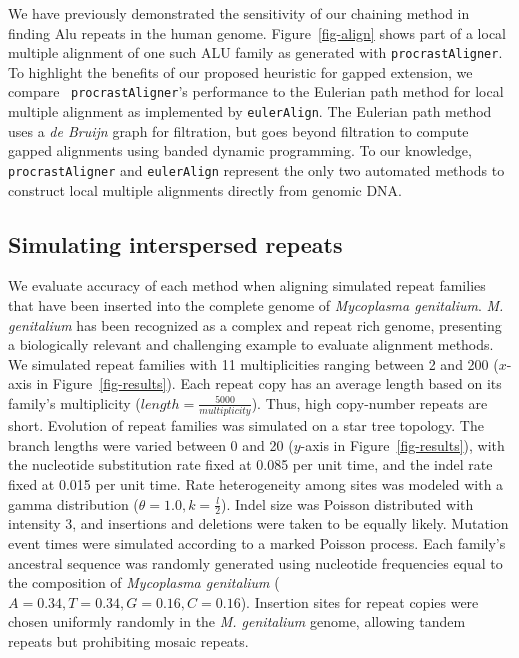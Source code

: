 \documentclass{ws-procs975x65}
\begin{document}
We have previously demonstrated the sensitivity of our chaining method in finding Alu repeats in
the human genome\cite{ref-procrast}. Figure~\ref{fig-align} shows part of a  local multiple alignment of one such ALU family as generated with \texttt{procrastAligner}. To highlight the benefits of our proposed heuristic for gapped extension, we compare ~\texttt{procrastAligner}'s performance to the Eulerian path method for local multiple alignment as implemented by \texttt{eulerAlign}\cite{ref-related1}. The Eulerian path method uses
a \textit{de Bruijn} graph for filtration, but goes beyond filtration to compute gapped alignments using banded dynamic
programming.  To our knowledge, \texttt{procrastAligner} and \texttt{eulerAlign} represent the only two automated methods to construct local multiple alignments directly from genomic DNA.

\subsection{Simulating interspersed repeats}
We evaluate accuracy of each method when aligning simulated repeat families that have been inserted into the complete genome of \emph{Mycoplasma genitalium}. \emph{M. genitalium} has been recognized as a complex and repeat rich genome, presenting a biologically relevant and challenging example to evaluate alignment methods\cite{ref-mycoplasma}. We simulated repeat families with 11 multiplicities ranging between 2 and 200 ($x$-axis in Figure~\ref{fig-results}).  Each repeat copy has an average length based on its family's multiplicity ($length=\frac{5000}{multiplicity}$).  Thus, high copy-number repeats are short.  Evolution of repeat families was simulated on a star tree topology.  The branch lengths were varied between 0 and 20 ($y$-axis in Figure~\ref{fig-results}), with the nucleotide substitution rate fixed at 0.085 per unit time, and the indel rate fixed at 0.015 per unit time.  Rate heterogeneity among sites was modeled with a gamma distribution ($\theta = 1.0, k = \frac{l}{2}$).  Indel size was Poisson distributed with intensity 3, and insertions and deletions were taken to be equally likely.  Mutation event times were simulated according to a marked Poisson process.  Each family's ancestral sequence was randomly generated using nucleotide frequencies equal to the composition of \emph{Mycoplasma genitalium} ($A=0.34,T=0.34,G=0.16,C=0.16$). Insertion sites for repeat copies were chosen uniformly randomly in the \textit{M. genitalium} genome, allowing tandem repeats but prohibiting mosaic repeats.
\end{document}

